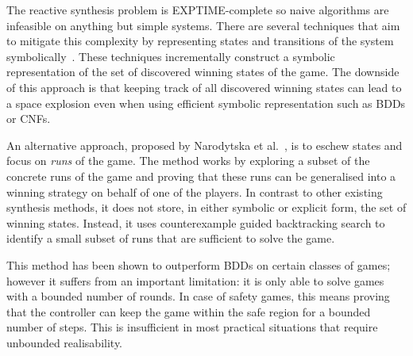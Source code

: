 \documentclass{llncs}
\begin{document}
The reactive synthesis problem is EXPTIME-complete so
naive algorithms are infeasible on anything but simple systems.
There are several techniques that aim to mitigate this complexity by
representing states and transitions of the system symbolically~\cite{Piterman_PS_06,bloem2014,morgenstern2013}. 
These techniques incrementally construct a symbolic representation of the set of 
discovered winning states of the game.  The downside of this approach is that 
keeping track of all discovered winning states can lead to a space explosion even
when using efficient symbolic representation such as BDDs or CNFs.



An alternative approach, proposed by Narodytska et al.~\cite{narodytska2014},
is to eschew states and focus on \emph{runs} of the game.  The method works by
exploring a subset of the concrete runs of the game and proving that these runs can be
generalised into a winning strategy on behalf of one of the players. In contrast to 
other existing synthesis methods, it does not store,
in either symbolic or explicit form, the set of winning states.
Instead, it uses counterexample guided backtracking search to identify a small subset
of runs that are sufficient to solve the game.

This method has been shown to outperform BDDs on certain classes of games; however it
suffers from an important limitation: it is only able to solve games with a bounded number
of rounds.  In case of safety games, this means proving that the controller 
can keep the game within the safe region for a bounded number of steps.  
This is insufficient in most practical situations that require unbounded realisability.
\end{document}

